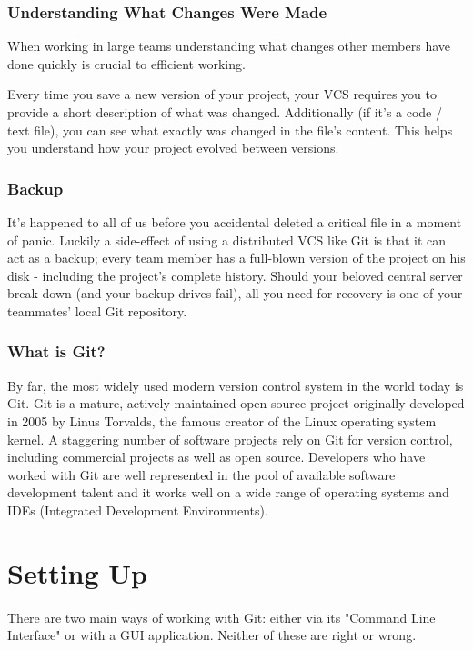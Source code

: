 \documentclass{article}
\begin{document}
    \subsubsection{Understanding What Changes Were Made}
    When working in large teams understanding what changes other members have done quickly is crucial to efficient working. 
    
    Every time you save a new version of your project, your VCS requires you to provide a short description of what was changed. Additionally (if it's a code / text file), you can see what exactly was changed in the file's content. This helps you understand how your project evolved between versions.
    
    \subsubsection{Backup}
    It's happened to all of us before you accidental deleted a critical file in a moment of panic. Luckily a side-effect of using a distributed VCS like Git is that it can act as a backup; every team member has a full-blown version of the project on his disk - including the project's complete history. Should your beloved central server break down (and your backup drives fail), all you need for recovery is one of your teammates' local Git repository.
    
    \subsubsection{What is Git?}
    By far, the most widely used modern version control system in the world today is Git. Git is a mature, actively maintained open source project originally developed in 2005 by Linus Torvalds, the famous creator of the Linux operating system kernel. A staggering number of software projects rely on Git for version control, including commercial projects as well as open source. Developers who have worked with Git are well represented in the pool of available software development talent and it works well on a wide range of operating systems and IDEs (Integrated Development Environments).
    
\section{Setting Up}
\paragraph{}
There are two main ways of working with Git: either via its "Command Line Interface" or with a GUI application. Neither of these are right or wrong.
\end{document}
